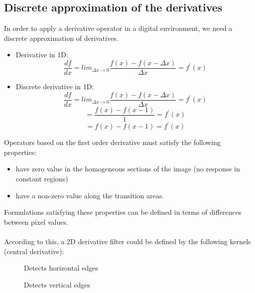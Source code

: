 \subsection{Discrete approximation of the derivatives}
In order to apply a derivative operator in a digital environment, we need a discrete approximation of derivatives. 
\begin{itemize}
    \item Derivative in 1D:
    \[\frac{df}{dx} = lim_{\Delta x \rightarrow 0} \frac{f(x) - f(x - \Delta x)}{\Delta x} = f^{'}(x)\]
    \item Discrete derivative in 1D:
    \[\frac{df}{dx} = lim_{\Delta x \rightarrow 0} \frac{f(x) - f(x - \Delta x)}{\Delta x} = f^{'}(x)\]
    \[= \frac{f(x) - f(x - 1)}{1} = f^{'}(x)\]
    \[= f(x) - f(x - 1) = f^{'}(x)\]
\end{itemize}
Operators based on the first order derivative must satisfy the following properties:
\begin{itemize}
    \item have zero value in the homogeneous sections of the image (no response in constant regions)
    \item have a non-zero value along the transition areas.
\end{itemize}
Formulations satisfying these properties can be defined in terms of differences between pixel values.\\\\
According to this, a 2D derivative filter could be defined by the following kernels (central derivative):
\begin{figure}[h]
        \centering
        \begin{minipage}{0.45\linewidth}
        \centering
        \caption*{Detects horizontal edges}
        \end{minipage}
        \hspace{20pt}
        \begin{minipage}{0.45\linewidth}
        \centering
        \caption*{Detects vertical edges}
        \end{minipage}
\end{figure}

